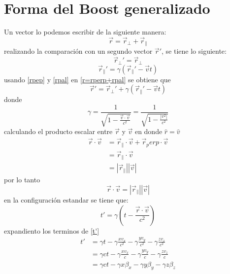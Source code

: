 \documentclass[12pt,letterpaper]{report}
\begin{document}
\section*{Forma del Boost generalizado}
Un vector lo podemos escribir de la siguiente manera:
\begin{equation}
    \vec{r}=\vec{r}_{\perp}+\vec{r}_{\parallel}
    \label{r=rperp+rpal}
\end{equation}
realizando la comparación con un segundo vector $\vec{r}'$, se tiene lo siguiente:
\begin{equation}
    \vec{r}_{\perp}' = \vec{r}_{\perp}
    \label{rpep}
\end{equation}
\begin{equation}
    \vec{r}_{\parallel}'=\gamma (\vec{r}_{\parallel}'-\vec{v}t)
    \label{rpal}
\end{equation}
usando \ref{rpep} y \ref{rpal} en \ref{r=rperp+rpal} se obtiene que
\begin{equation}
    \vec{r}'=\vec{r}_\perp'+\gamma (\vec{r}_\parallel' - \vec{v}t)
    \label{r'conrpep}
\end{equation}
donde
\begin{equation}
    \gamma= \frac{1}{\sqrt{1-\frac{\vec{v}\cdot\vec{v}}{c^2}}} = \frac{1}{\sqrt{1-\frac{|v^2|}{c^2}}}
    \label{gamma}
\end{equation}
calculando el producto escalar entre $\vec{r}$ y $\vec{v}$ en donde $\hat{r}=\hat{v}$
\begin{align*}
    \vec{r} \cdot \vec{v}   &= \vec{r}_\parallel \cdot \vec{v} + \vec{r}_perp \cdot \vec{v} \\
                            &=\vec{r}_\parallel \cdot \vec{v} \\
                            &=|\vec{r}_\parallel| |\vec{v}|
\end{align*}
por lo tanto
\begin{equation}
    \vec{r} \cdot \vec{v} =|\vec{r}_\parallel| |\vec{v}|
    \label{r.v}
\end{equation}
en la configuración estandar se tiene que:
\begin{equation}
    t'= \gamma\left( t-\frac{\vec{r}\cdot \vec{v}}{c^2} \right)
    \label{t'}
\end{equation}
expandiento los terminos de \ref{t'}
\begin{align*}
    t'  &= \gamma t - \gamma \frac{xv_x}{c^2}- \gamma \frac{yv_y}{c^2}- \gamma \frac{zv_z}{c^2}\\
        &= \gamma ct - \gamma \frac{xv_x}{c}- \gamma \frac{yv_y}{c}- \gamma \frac{zv_z}{c}\\
        &=  \gamma ct - \gamma x \beta_x - \gamma y \beta_y - \gamma z \beta_z
\end{align*}
\end{document}
